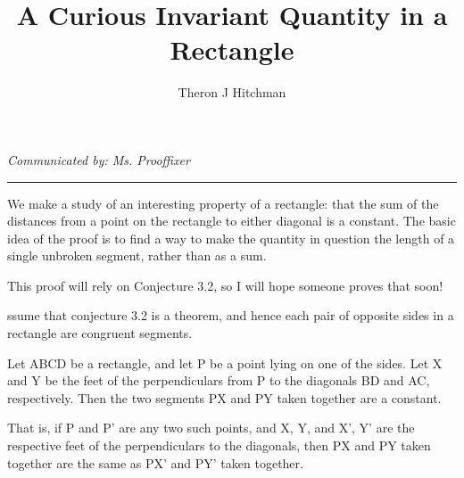 \documentclass[12pt]{article}
\newenvironment{theorem}[2][Theorem]{\begin{trivlist}
\item[\hskip \labelsep {\bfseries #1:}]}{\end{trivlist}}
\begin{document}
 
 
\title{A Curious Invariant Quantity in a Rectangle} %
\author{Theron J Hitchman} %
 
\maketitle

{%
\centering
\textit{Communicated by: Ms. Prooffixer} %
\par
}
\hrule
\vspace{.2in}

We make a study of an interesting property of a rectangle: that the sum of the distances from a point on the rectangle to either diagonal is a constant. The basic idea of the proof is to find a way to make the quantity in question the length of a single unbroken segment, rather than as a sum.

This proof will rely on Conjecture 3.2, so I will hope someone proves that soon!
 
\begin{theorem}
Assume that conjecture 3.2 is a theorem, and hence each pair of opposite sides in a rectangle are congruent segments.

Let ABCD be a rectangle, and let P be a point lying on one of the sides. Let X and Y be the feet
of the perpendiculars from P to the diagonals BD and AC, respectively. Then the two segments PX and PY taken together are a constant. 

That is, if P and P' are any two such points, and X, Y, and X', Y' are the respective feet of the perpendiculars to the diagonals, then PX and PY taken together are the same as PX' and PY' taken together.
\end{theorem}
 
\end{document}
